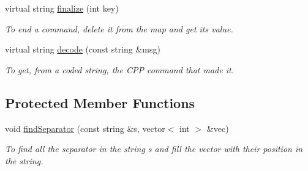 \begin{DoxyCompactItemize}
virtual string \hyperlink{classMapper_a568fcb8dba98cb9d37700972ef5d8df0}{finalize} (int key)
\begin{DoxyCompactList}\small\item\em To end a command, delete it from the map and get its value. \item\end{DoxyCompactList}\item 
virtual string \hyperlink{classMapper_a5e51b9148704b25e26e5ec48bd643a0b}{decode} (const string \&msg)
\begin{DoxyCompactList}\small\item\em To get, from a coded string, the CPP command that made it. \item\end{DoxyCompactList}\end{DoxyCompactItemize}
\subsection*{Protected Member Functions}
\begin{DoxyCompactItemize}
\item 
void \hyperlink{classMapper_ae19b072bc022475bc6c9e9943d4851f4}{findSeparator} (const string \&s, vector$<$ int $>$ \&vec)
\begin{DoxyCompactList}\small\item\em To find all the separator in the string s and fill the vector with their position in the string. \item\end{DoxyCompactList}\end{DoxyCompactItemize}
